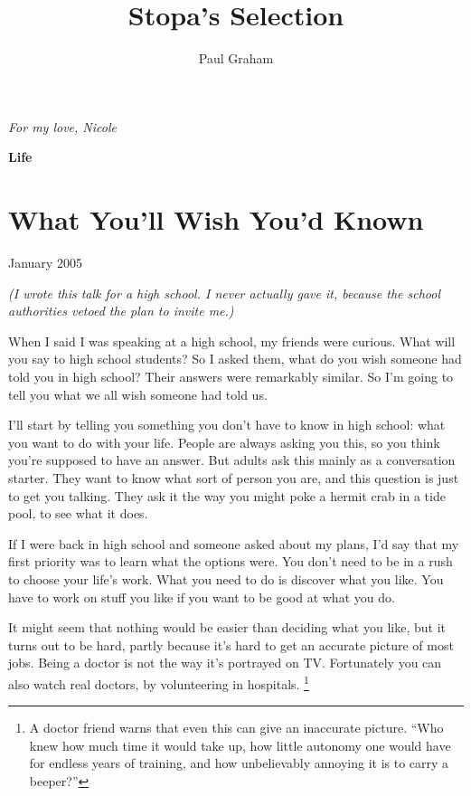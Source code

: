 \documentclass[12pt]{book}
\title{Stopa's Selection}
\author{Paul Graham}
\date{}
\begin{document}
\frontmatter
\maketitle
\clearpage
\thispagestyle{empty}
\vspace*{\fill}
\begin{center}
{\large\itshape For my love, Nicole}
\end{center}
\vspace*{\fill}
\clearpage
\tableofcontents
\clearpage
\mainmatter


\clearpage
\thispagestyle{empty}
\vspace*{\fill}
\begin{center}
{\LARGE\bfseries Life}
\end{center}
\vspace*{\fill}
\clearpage

\chapter{What You'll Wish You'd Known}

January 2005

\emph{(I wrote this talk for a high school. I never actually gave it,
because the school authorities vetoed the plan to invite me.)}

When I said I was speaking at a high school, my friends were curious.
What will you say to high school students? So I asked them, what do you
wish someone had told you in high school? Their answers were remarkably
similar. So I'm going to tell you what we all wish someone had told us.

I'll start by telling you something you don't have to know in high
school: what you want to do with your life. People are always asking you
this, so you think you're supposed to have an answer. But adults ask
this mainly as a conversation starter. They want to know what sort of
person you are, and this question is just to get you talking. They ask
it the way you might poke a hermit crab in a tide pool, to see what it
does.

If I were back in high school and someone asked about my plans, I'd say
that my first priority was to learn what the options were. You don't
need to be in a rush to choose your life's work. What you need to do is
discover what you like. You have to work on stuff you like if you want
to be good at what you do.

It might seem that nothing would be easier than deciding what you like,
but it turns out to be hard, partly because it's hard to get an accurate
picture of most jobs. Being a doctor is not the way it's portrayed on
TV. Fortunately you can also watch real doctors, by volunteering in
hospitals. \footnote{A doctor friend warns that even this can give an inaccurate
picture. ``Who knew how much time it would take up, how little autonomy
one would have for endless years of training, and how unbelievably
annoying it is to carry a beeper?''}
\end{document}
